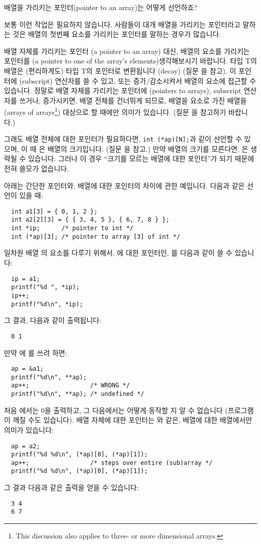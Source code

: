 \begin{faq}
	배열을 가리키는 포인터(pointer to an array)는 어떻게 선언하죠?

\A
	보통 이런 작업은 필요하지 않습니다.  사람들이 대개
	배열을 가리키는 포인터라고 말하는 것은 배열의 첫번째 요소를
	가리키는 포인터를 말하는 경우가 많습니다.

	배열 자체를 가리키는 포인터 (a pointer to an array) 대신,
	배열의 요소를 가리키는 포인터를 (a pointer to one of the
	array's elements)생각해보시기 바랍니다. 
	타입 T의 배열은 (편리하게도) 타입 T의 포인터로
	변환됩니다 (decay) (질문 을 참고). 
	이 포인터에 \TT{[]} (subscript) 연산자를 쓸 수 있고,
	또는 증가/감소시켜서 배열의 요소에 접근할 수 있습니다.
	정말로 배열 자체를 가리키는 포인터에 (pointers to arrays),
	subscript 연산자를 쓰거나, 증가시키면, 배열 전체를
	건너뛰게 되므로, 배열을 요소로 가진 배열을 (arrays of
	arrays\footnote{This discussion also applies to three- or more
	  dimensional arrays.}) 대상으로 할 때에만 의미가 있습니다.
	(질문 을 참고하기 바랍니다.)

	그래도 배열 전체에 대한 포인터가 필요하다면, \verb+int (*ap)[N];+과
	같이 선언할 수 있으며, 이 때 은 배열의 크기입니다.  (질문
	을 참고.) 만약 배열의 크기를 모른다면, 은 생략될 수 있습니다.
	그러나 이 경우 ``크기를 모르는 배열에 대한 포인터''가 되기 때문에
	전혀 쓸모가 없습니다.

	아래는 간단한 포인터와, 배열에 대한 포인터의 차이에 관한
	예입니다. 다음과 같은 선언이 있을 때:
\begin{verbatim}
  int a1[3] = { 0, 1, 2 };
  int a2[2][3] = { { 3, 4, 5 }, { 6, 7, 8 } };
  int *ip;      /* pointer to int */
  int (*ap)[3]; /* pointer to array [3] of int */
\end{verbatim}
	일차원 배열 의 요소를 다루기 위해서, 에 대한 포인터인,
	를 다음과 같이 쓸 수 있습니다:
\begin{verbatim}
  ip = a1;
  printf("%d ", *ip);
  ip++;
  printf("%d\n", *ip);
\end{verbatim}
	그 결과, 다음과 같이 출력됩니다:
\begin{verbatim}
  0 1
\end{verbatim}
	만약 에 를 쓰려 하면:
\begin{verbatim}
  ap = &a1;
  printf("%d\n", **ap);
  ap++;                 /* WRONG */
  printf("%d\n", **ap); /* undefined */
\end{verbatim}
	처음 에서는 0을 출력하고, 그 다음에서는 어떻게 동작할 지
	알 수 없습니다 (프로그램이 깨질 수도 있습니다). 배열 자체에 대한
	포인터는 와 같은, 배열에 대한 배열에서만 의미가 있습니다:
\begin{verbatim}
  ap = a2;
  printf("%d %d\n", (*ap)[0], (*ap)[1]);
  ap++;                 /* steps over entire (sub)array */
  printf("%d %d\n", (*ap)[0], (*ap)[1]);
\end{verbatim}
	그 결과 다음과 같은 출력을 얻을 수 있습니다:
\begin{verbatim}
  3 4
  6 7
\end{verbatim}
	

\end{faq}
